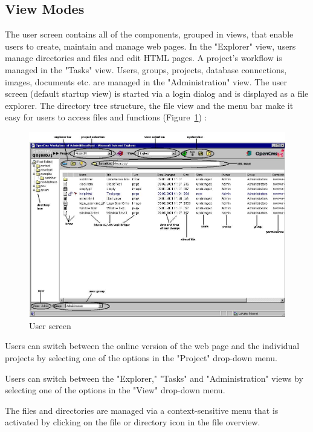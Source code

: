 \subsection{View Modes}

The user screen contains all of the components, grouped in views,
that enable users to create, maintain and manage web pages. In the
"Explorer" view, users manage directories and files and edit HTML
pages. A project's workflow is managed in the "Tasks" view. Users,
groups, projects, database connections, images, documents etc. are
managed in the "Administration" view. The user screen (default
startup view) is started via a login dialog and is displayed as a
file explorer. The directory tree structure, the file view and the
menu bar make it easy for users to access files and functions
(Figure~\ref{workplace}) :

\begin{figure}[hbt]
\begin{center}
\includegraphics[width=\sgw]
                   {pics/usermanual/workplace}
\caption[User screen]
           {User screen}
\label{workplace}
\end{center}
\end{figure}

Users can switch between the online version of the web page and
the individual projects by selecting one of the options in the
"Project" drop-down menu.

Users can switch between the "Explorer," "Tasks" and
"Administration" views by selecting one of the options in the
"View" drop-down menu.

The files and directories are managed via a context-sensitive menu
that is activated by clicking on the file or directory icon in the
file overview.

